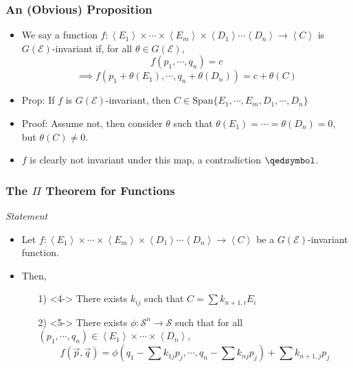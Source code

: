 \documentclass{beamer}
\newcommand{\avg}[1]{\left<#1\right>}
\begin{document}
\begin{frame}
    \frametitle{An (Obvious) Proposition}
    \begin{itemize}
        \item<1-> We say a function $f:\avg{E_1}\times\cdots\times\avg{E_m}\times\avg{D_1}\cdots\avg{D_n}\rightarrow\avg{C}$ is $G(\mathcal{E})$-invariant if, for all $\theta \in G(\mathcal{E})$, \[ f(p_1,\cdots,q_n) = c \]\[ \implies f(p_1 + \theta(E_1), \cdots, q_n + \theta(D_n)) = c + \theta(C) \]
        \item<2-> Prop: If $f$ is $G(\mathcal{E})$-invariant, then $C \in \text{Span}\{E_1,\cdots,E_m,D_1,\cdots,D_n\}$
        \item<3-> Proof: Assume not, then consider $\theta$ such that $\theta(E_1) = \cdots = \theta(D_n) = 0$, but $\theta(C) \neq 0$.
        \item<4-> $f$ is clearly not invariant under this map, a contradiction $\qedsymbol$.
    \end{itemize}
\end{frame}

\begin{frame}
    \frametitle{The $\Pi$ Theorem for Functions}
    \alert{\textit{Statement}}
    \begin{itemize}
        \item<2-> Let $f:\avg{E_1}\times\cdots\times\avg{E_m}\times\avg{D_1}\cdots\avg{D_n}\rightarrow\avg{C}$ be a $G(\mathcal{E})$-invariant function.
        \item<3-> Then,
        \begin{itemize}
            \item[1)]<4-> There exists $k_{ij}$ such that $C = \sum k_{n+1, i}E_i$
            \item[2)]<5-> There exists $\phi:\mathcal{S}^n\rightarrow\mathcal{S}$ such that for all $(p_1, \cdots, q_n) \in \avg{E_1}\times\cdots\times\avg{D_n}$, \[ f(\vec{p}, \vec{q}) = \phi(q_1 - \sum k_{1j}p_j, \cdots, q_n - \sum k_{nj}p_j) + \sum k_{n+1,j}p_j \]
        \end{itemize}
    \end{itemize}
\end{frame}
\end{document}
